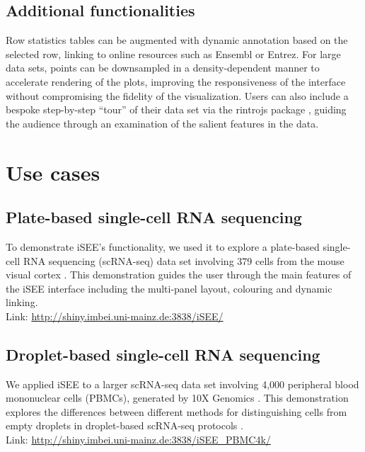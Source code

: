 \documentclass[10pt,a4paper,twocolumn]{article}
\let\cite\citep
\begin{document}
\subsection*{Additional functionalities}
Row statistics tables can be augmented with dynamic annotation based on the selected row, linking to online resources such as Ensembl or Entrez. %
For large data sets, points can be downsampled in a density-dependent manner to accelerate rendering of the plots, improving the responsiveness of the interface without compromising the fidelity of the visualization.
Users can also include a bespoke step-by-step ``tour'' of their data set via the rintrojs package \cite{ganz2016rintrojs}, guiding the audience through an examination of the salient features in the data.

\section*{Use cases} %

\subsection*{Plate-based single-cell RNA sequencing}
To demonstrate iSEE's functionality, we used it to explore a plate-based single-cell RNA sequencing (scRNA-seq) data set involving 379 cells from the mouse visual cortex \citep{tasic2016allen}.
This demonstration guides the user through the main features of the iSEE interface including the multi-panel layout, colouring and dynamic linking.\\

Link: \url{http://shiny.imbei.uni-mainz.de:3838/iSEE/}

\subsection*{Droplet-based single-cell RNA sequencing}
We applied iSEE to a larger scRNA-seq data set involving 4,000 peripheral blood mononuclear cells (PBMCs), generated by 10X Genomics \citep{zheng2017massively}.
This demonstration explores the differences between different methods for distinguishing cells from empty droplets in droplet-based scRNA-seq protocols \citep{lun2018distinguishing}.\\

Link: \url{http://shiny.imbei.uni-mainz.de:3838/iSEE_PBMC4k/}
\end{document}
